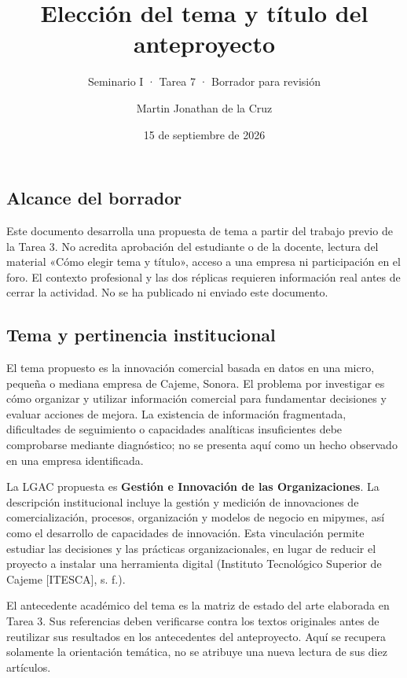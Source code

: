 \documentclass[
  spanish,
  11pt,
]{article}
\title{Elección del tema y título del anteproyecto}
\subtitle{Seminario I · Tarea 7 · Borrador para revisión}
\author{Martin Jonathan de la Cruz}
\date{15 de septiembre de 2026}
\begin{document}
\maketitle

\subsection{Alcance del borrador}\label{alcance-del-borrador}

Este documento desarrolla una propuesta de tema a partir del trabajo
previo de la Tarea 3. No acredita aprobación del estudiante o de la
docente, lectura del material «Cómo elegir tema y título», acceso a una
empresa ni participación en el foro. El contexto profesional y las dos
réplicas requieren información real antes de cerrar la actividad. No se
ha publicado ni enviado este documento.

\subsection{Tema y pertinencia
institucional}\label{tema-y-pertinencia-institucional}

El tema propuesto es la innovación comercial basada en datos en una
micro, pequeña o mediana empresa de Cajeme, Sonora. El problema por
investigar es cómo organizar y utilizar información comercial para
fundamentar decisiones y evaluar acciones de mejora. La existencia de
información fragmentada, dificultades de seguimiento o capacidades
analíticas insuficientes debe comprobarse mediante diagnóstico; no se
presenta aquí como un hecho observado en una empresa identificada.

La LGAC propuesta es \textbf{Gestión e Innovación de las
Organizaciones}. La descripción institucional incluye la gestión y
medición de innovaciones de comercialización, procesos, organización y
modelos de negocio en mipymes, así como el desarrollo de capacidades de
innovación. Esta vinculación permite estudiar las decisiones y las
prácticas organizacionales, en lugar de reducir el proyecto a instalar
una herramienta digital (Instituto Tecnológico Superior de Cajeme
{[}ITESCA{]}, s. f.).

El antecedente académico del tema es la matriz de estado del arte
elaborada en Tarea 3. Sus referencias deben verificarse contra los
textos originales antes de reutilizar sus resultados en los antecedentes
del anteproyecto. Aquí se recupera solamente la orientación temática, no
se atribuye una nueva lectura de sus diez artículos.
\end{document}
